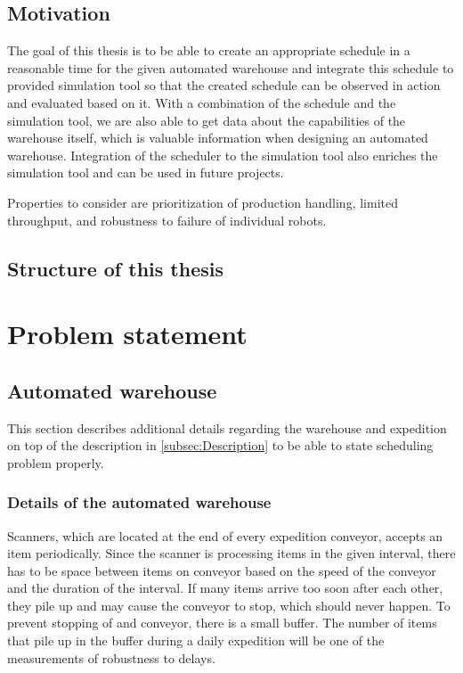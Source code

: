 \documentclass{ctuthesis}
\begin{document}
\section{Motivation}

The goal of this thesis is to be able to create an appropriate schedule in a reasonable time for the given automated warehouse and integrate this schedule to provided simulation tool so that the created schedule can be observed in action and evaluated based on it. With a combination of the schedule and the simulation tool, we are also able to get data about the capabilities of the warehouse itself, which is valuable information when designing an automated warehouse. Integration of the scheduler to the simulation tool also enriches the simulation tool and can be used in future projects.

Properties to consider are prioritization of production handling, limited throughput, and robustness to failure of individual robots. 

\section{Structure of this thesis}



\chapter{Problem statement}
\section{Automated warehouse}
\label{sec:Automated warehouse}

This section describes additional details regarding the warehouse and expedition on top of the description in \ref{subsec:Description} to be able to state scheduling problem properly.

\subsection{Details of the automated warehouse}


Scanners, which are located at the end of every expedition conveyor, accepts an item periodically. Since the scanner is processing items in the given interval, there has to be space between items on conveyor based on the speed of the conveyor and the duration of the interval. If many items arrive too soon after each other, they pile up and may cause the conveyor to stop, which should never happen. To prevent stopping of and conveyor, there is a small buffer. The number of items that pile up in the buffer during a daily expedition will be one of the measurements of robustness to delays.
\end{document}
